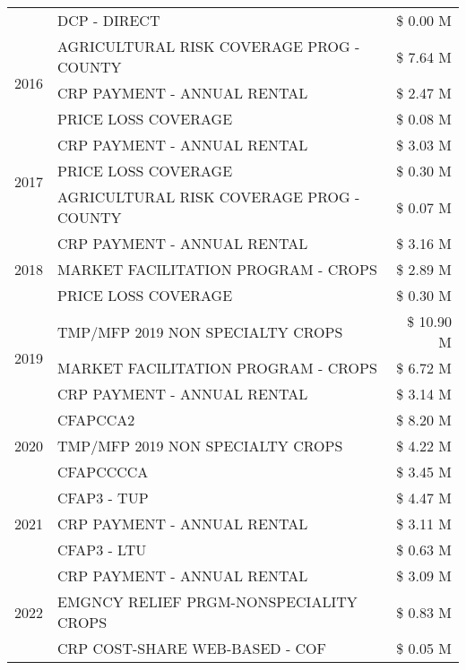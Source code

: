\begin{tabular}{llr}
 & DCP - DIRECT & \$ 0.00 M \\
\cline{1-3}
\multirow[t]{3}{*}{2016} & AGRICULTURAL RISK COVERAGE PROG - COUNTY & \$ 7.64 M \\
 & CRP PAYMENT - ANNUAL RENTAL & \$ 2.47 M \\
 & PRICE LOSS COVERAGE & \$ 0.08 M \\
\cline{1-3}
\multirow[t]{3}{*}{2017} & CRP PAYMENT - ANNUAL RENTAL & \$ 3.03 M \\
 & PRICE LOSS COVERAGE & \$ 0.30 M \\
 & AGRICULTURAL RISK COVERAGE PROG - COUNTY & \$ 0.07 M \\
\cline{1-3}
\multirow[t]{3}{*}{2018} & CRP PAYMENT - ANNUAL RENTAL & \$ 3.16 M \\
 & MARKET FACILITATION PROGRAM - CROPS & \$ 2.89 M \\
 & PRICE LOSS COVERAGE & \$ 0.30 M \\
\cline{1-3}
\multirow[t]{3}{*}{2019} & TMP/MFP 2019 NON SPECIALTY CROPS & \$ 10.90 M \\
 & MARKET FACILITATION PROGRAM - CROPS & \$ 6.72 M \\
 & CRP PAYMENT - ANNUAL RENTAL & \$ 3.14 M \\
\cline{1-3}
\multirow[t]{3}{*}{2020} & CFAPCCA2 & \$ 8.20 M \\
 & TMP/MFP 2019 NON SPECIALTY CROPS & \$ 4.22 M \\
 & CFAPCCCCA & \$ 3.45 M \\
\cline{1-3}
\multirow[t]{3}{*}{2021} & CFAP3 - TUP & \$ 4.47 M \\
 & CRP PAYMENT - ANNUAL RENTAL & \$ 3.11 M \\
 & CFAP3 - LTU & \$ 0.63 M \\
\cline{1-3}
\multirow[t]{3}{*}{2022} & CRP PAYMENT - ANNUAL RENTAL & \$ 3.09 M \\
 & EMGNCY RELIEF PRGM-NONSPECIALITY CROPS & \$ 0.83 M \\
 & CRP COST-SHARE WEB-BASED - COF & \$ 0.05 M \\
\cline{1-3}
\bottomrule
\end{tabular}
